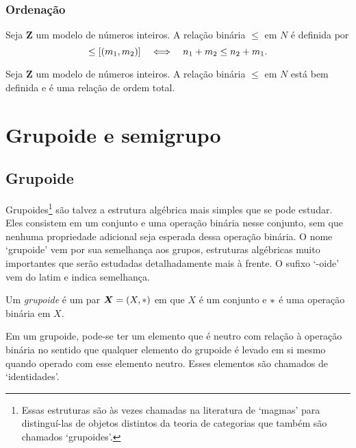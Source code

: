 \subsubsection{Ordenação}

\begin{definition}
	Seja $\bm Z$ um modelo de números inteiros. A relação binária $\leq$ em $N$ é definida por
	\begin{equation*}
	[(n_1,n_2)] \leq [(m_1,m_2)] \sse n_1+m_2 \leq n_2+m_1.
	\end{equation*}
\end{definition}

\begin{exercise}
	Seja $\bm Z$ um modelo de números inteiros. A relação binária $\leq$ em $N$ está bem definida e é uma relação de ordem total.
\end{exercise}


\section{Grupoide e semigrupo}

\subsection{Grupoide}

Grupoides\footnote{Essas estruturas são às vezes chamadas na literatura de `magmas' para distinguí-las de objetos distintos da teoria de categorias que também são chamados `grupoides'.} são talvez a estrutura algébrica mais simples que se pode estudar. Eles consistem em um conjunto e uma operação binária nesse conjunto, sem que nenhuma propriedade adicional seja esperada dessa operação binária. O nome `grupoide' vem por sua semelhança aos grupos, estruturas algébricas muito importantes que serão estudadas detalhadamente mais à frente. O sufixo `-oide' vem do latim e indica semelhança.

\begin{definition}
Um \emph{grupoide} é um par $\bm X=(X,\ast)$ em que $X$ é um conjunto e $\ast$ é uma operação binária em $X$.
\end{definition}

Em um grupoide, pode-se ter um elemento que é neutro com relação à operação binária no sentido que qualquer elemento do grupoide é levado em si mesmo quando operado com esse elemento neutro. Esses elementos são chamados de `identidades'.

